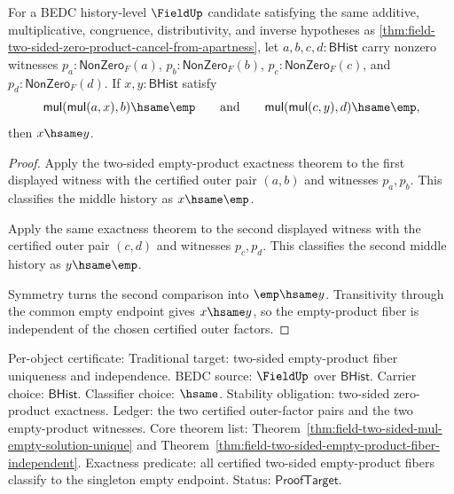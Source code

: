 \begin{theorem}
\label{thm:field-two-sided-empty-product-fiber-independent}
For a BEDC history-level $\FieldUp$ candidate satisfying the same additive,
multiplicative, congruence, distributivity, and inverse hypotheses as
\autoref{thm:field-two-sided-zero-product-cancel-from-apartness}, let
$a,b,c,d:\mathsf{BHist}$ carry nonzero witnesses
$p_a:\mathsf{NonZero}_F(a)$, $p_b:\mathsf{NonZero}_F(b)$,
$p_c:\mathsf{NonZero}_F(c)$, and $p_d:\mathsf{NonZero}_F(d)$. If
$x,y:\mathsf{BHist}$ satisfy
$$
\mathsf{mul}(\mathsf{mul}(a,x),b)\hsame\emp
\qquad\text{and}\qquad
\mathsf{mul}(\mathsf{mul}(c,y),d)\hsame\emp,
$$
then $x\hsame y$.
\end{theorem}
\begin{proof}
Apply the two-sided empty-product exactness theorem to the first displayed
witness with the certified outer pair $(a,b)$ and witnesses $p_a,p_b$. This
classifies the middle history as $x\hsame\emp$.

Apply the same exactness theorem to the second displayed witness with the
certified outer pair $(c,d)$ and witnesses $p_c,p_d$. This classifies the
second middle history as $y\hsame\emp$.

Symmetry turns the second comparison into $\emp\hsame y$. Transitivity through
the common empty endpoint gives $x\hsame y$, so the empty-product fiber is
independent of the chosen certified outer factors.
\end{proof}

Per-object certificate: Traditional target: two-sided empty-product fiber
uniqueness and independence. BEDC source: $\FieldUp$ over $\mathsf{BHist}$.
Carrier choice: $\mathsf{BHist}$. Classifier choice: $\hsame$. Stability
obligation: two-sided zero-product exactness. Ledger: the two certified
outer-factor pairs and the two empty-product witnesses. Core theorem list:
Theorem~\ref{thm:field-two-sided-mul-empty-solution-unique} and
Theorem~\ref{thm:field-two-sided-empty-product-fiber-independent}. Exactness
predicate: all certified two-sided empty-product fibers classify to the
singleton empty endpoint. Status: $\mathsf{ProofTarget}$.

